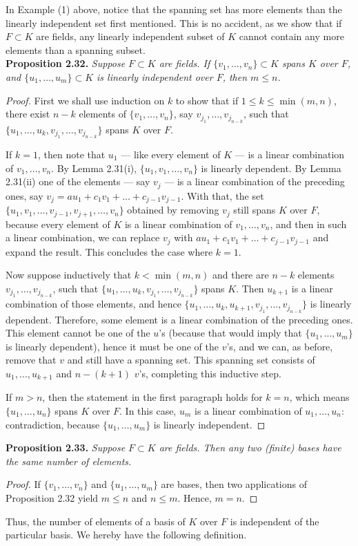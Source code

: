 \documentclass[leqno]{book}
\begin{document}
\noindent In Example (1) above, notice that the spanning set has more elements than the linearly independent set first mentioned.  This is no accident, as we show that if $F\subset K$ are fields, any linearly independent subset of $K$ cannot contain any more elements than a spanning subset.\\

\noindent\textbf{Proposition 2.32.} \emph{Suppose $F\subset K$ are fields.  If $\{v_1,\dots,v_n\}\subset K$ spans $K$ over $F$, and $\{u_1,\dots,u_m\}\subset K$ is linearly independent over $F$, then $m\leqslant n$.}
\begin{proof}
First we shall use induction on $k$ to show that if $1\leqslant k\leqslant\min(m,n)$, there exist $n-k$ elements of $\{v_1,\dots,v_n\}$, say $v_{j_1},\dots,v_{j_{n-k}}$, such that $\{u_1,\dots,u_k,v_{j_1},\dots,v_{j_{n-k}}\}$ spans $K$ over $F$.

If $k=1$, then note that $u_1$ \---- like every element of $K$ \---- is a linear combination of $v_1,\dots,v_n$.  By Lemma 2.31(i), $\{u_1,v_1,\dots,v_n\}$ is linearly dependent.  By Lemma 2.31(ii) one of the elements \---- say $v_j$ \---- is a linear combination of the preceding ones, say $v_j=au_1+c_1v_1+\dots+c_{j-1}v_{j-1}$.  With that, the set $\{u_1,v_1,\dots,v_{j-1},v_{j+1},\dots,v_n\}$ obtained by removing $v_j$ still spans $K$ over $F$, because every element of $K$ is a linear combination of $v_1,\dots,v_n$, and then in such a linear combination, we can replace $v_j$ with $au_1+c_1v_1+\dots+c_{j-1}v_{j-1}$ and expand the result.  This concludes the case where $k=1$.

Now suppose inductively that $k<\min(m,n)$ and there are $n-k$ elements $v_{j_1},\dots,v_{j_{n-k}}$, such that $\{u_1,\dots,u_k,v_{j_1},\dots,v_{j_{n-k}}\}$ spans $K$.  Then $u_{k+1}$ is a linear combination of those elements, and hence $\{u_1,\dots,u_k,u_{k+1},v_{j_1},\dots,v_{j_{n-k}}\}$ is linearly dependent.  Therefore, some element is a linear combination of the preceding ones.  This element cannot be one of the $u$'s (because that would imply that $\{u_1,\dots,u_m\}$ is linearly dependent), hence it must be one of the $v$'s, and we can, as before, remove that $v$ and still have a spanning set.  This spanning set consists of $u_1,\dots,u_{k+1}$ and $n-(k+1)$ $v$'s, completing this inductive step.

If $m>n$, then the statement in the first paragraph holds for $k=n$, which means $\{u_1,\dots,u_n\}$ spans $K$ over $F$.  In this case, $u_m$ is a linear combination of $u_1,\dots,u_n$: contradiction, because $\{u_1,\dots,u_m\}$ is linearly independent.
\end{proof}
\noindent\textbf{Proposition 2.33.} \emph{Suppose $F\subset K$ are fields.  Then any two (finite) bases have the same number of elements.}
\begin{proof}
If $\{v_1,\dots,v_n\}$ and $\{u_1,\dots,u_m\}$ are bases, then two applications of Proposition 2.32 yield $m\leqslant n$ and $n\leqslant m$.  Hence, $m=n$.
\end{proof}
\noindent Thus, the number of elements of a basis of $K$ over $F$ is independent of the particular basis.  We hereby have the following definition.\\
\end{document}
